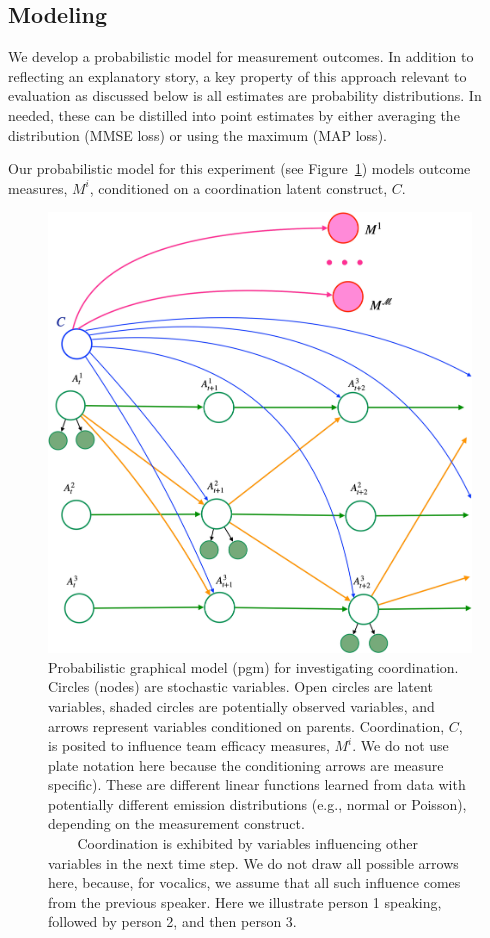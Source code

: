 \subsection{Modeling}
    We develop a probabilistic model for measurement outcomes. In addition to
    reflecting an explanatory story, a key property of this approach relevant to
    evaluation as discussed below is all estimates are probability
    distributions. In needed, these can be distilled into point estimates by
    either averaging the distribution (MMSE loss) or using the maximum (MAP
    loss). 

    Our probabilistic model for this experiment (see  Figure~\ref{fig:pgm})
    models outcome measures, $M^i$, conditioned on a coordination latent construct, $C$. 
%
    \begin{figure}
    \label{fig:pgm}
    \includegraphics[width=6in]{images/prereg-pgm.pdf}
    \caption{Probabilistic graphical model (pgm) for investigating coordination.
    Circles (nodes) are stochastic variables. 
    Open circles are latent variables, shaded circles are potentially observed
    variables, and arrows represent variables conditioned on parents.
    Coordination, $C$, is posited to influence team efficacy measures, $M^i$.
    We do not use plate notation here because the conditioning arrows are
    measure specific). These are different linear functions learned from data with potentially
    different emission distributions (e.g., normal or Poisson), depending on the
    measurement construct. \\
    $~~~~~~~~$ Coordination is exhibited by variables influencing other variables in the
    next time step. We do not draw all possible arrows here, because, for
    vocalics, we assume that all  such influence comes from the previous speaker.
    Here we illustrate person 1 speaking, followed by person 2, and then person 3.  }
    \end{figure}
